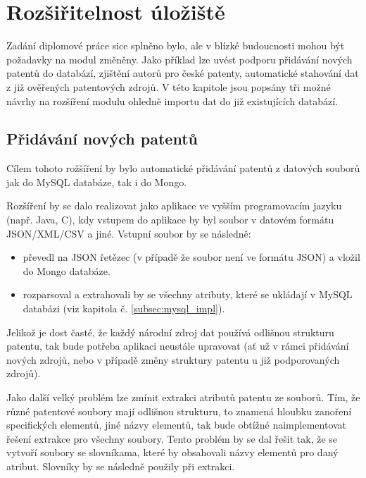 \chapter{Rozšiřitelnost úložiště}
Zadání diplomové práce sice splněno bylo, ale v blízké budoucnosti mohou být požadavky na modul změněny. Jako příklad lze uvést podporu přidávání nových patentů do databází, zjištění autorů pro české patenty, automatické stahování dat z již ověřených patentových zdrojů. V této kapitole jsou popsány tři možné návrhy na rozšíření modulu ohledně importu dat do již existujících databází.

\section{Přidávání nových patentů} \label{sec:new_patenty}
Cílem tohoto rožšíření by bylo automatické přidávání patentů z datových souborů jak do MySQL databáze, tak i do Mongo.

Rozšíření by se dalo realizovat jako aplikace ve vyšším programovacím jazyku (např. Java, C), kdy vstupem do aplikace by byl soubor v datovém formátu \gls{JSON}/\gls{XML}/\gls{CSV} a jiné. Vstupní soubor by se následně:
\begin{itemize}
\item převedl na \gls{JSON} řetězec (v případě že soubor není ve formátu \gls{JSON}) a vložil do Mongo databáze.
\item rozparsoval a extrahovali by se všechny atributy, které se ukládají v MySQL databázi (viz kapitola č. \ref{subsec:mysql_impl}).
\end{itemize}

Jelikož je dost časté, že každý národní zdroj dat používá odlišnou strukturu patentu, tak bude potřeba aplikaci neustále upravovat (ať už v rámci přidávání nových zdrojů, nebo v případě změny struktury patentu u již podporovaných zdrojů).

Jako další velký problém lze zmínit extrakci atributů patentu ze souborů. Tím, že různé patentové soubory mají odlišnou strukturu, to znamená hloubku zanoření specifických elementů, jiné názvy elementů, tak bude obtížné naimplementovat řešení extrakce pro všechny soubory. Tento problém by se dal řešit tak, že se vytvoří soubory se slovníkama, které by obsahovali názvy elementů pro daný atribut. Slovníky by se následně použily při extrakci.

